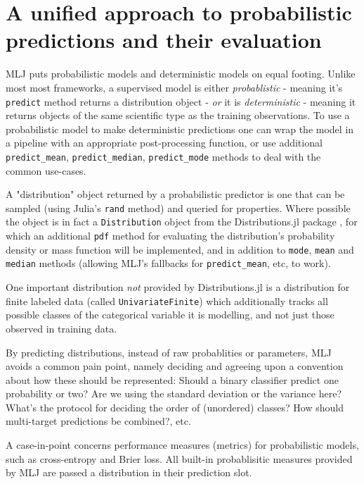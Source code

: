 \documentclass{article}
\begin{document}
\section{A unified approach to probabilistic predictions and their evaluation}

MLJ puts probabilistic models and deterministic models on equal footing. Unlike most most frameworks, a supervised model is either \textit{probablistic} - meaning it's \texttt{predict} method returns a distribution object - \textit{or} it is \textit{deterministic} - meaning it returns objects of the same scientific type as the training observations. To use a probabilistic model to make deterministic predictions one can wrap the model in a pipeline with an appropriate post-processing function, or use additional \texttt{predict\_mean}, \texttt{predict\_median}, \texttt{predict\_mode} methods to deal with the common use-cases.

A "distribution" object returned by a probabilistic predictor is one that can be sampled (using Julia's \texttt{rand} method) and queried for properties. Where possible the object is in fact a \texttt{Distribution} object from the Distributions.jl package \cite{LinEtal2020}, for which an additional \texttt{pdf} method for evaluating the distribution's probability density or mass function will be implemented, and in addition to \texttt{mode}, \texttt{mean} and \texttt{median} methods (allowing MLJ's fallbacks for \texttt{predict\_mean}, etc, to work).

One important distribution \textit{not} provided by Distributions.jl is a distribution for finite labeled data (called \texttt{UnivariateFinite}) which additionally tracks all possible classes of the categorical variable it is modelling, and not just those observed in training data.

By predicting distributions, instead of raw probablities or parameters, MLJ avoids a common pain point, namely deciding and agreeing upon a convention about how these should be represented: Should a binary classifier predict one probability or two? Are we using the standard deviation or the variance here? What's the protocol for deciding the order of (unordered) classes? How should multi-target predictions be combined?, etc.

A case-in-point concerns performance measures (metrics) for probabilistic models, such as cross-entropy and Brier loss. All built-in probablisitic measures provided by MLJ are passed a distribution in their prediction slot.
\end{document}
